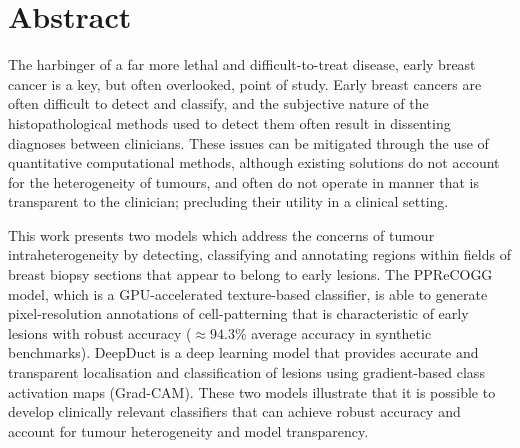 \newpage
\section*{Abstract}

The harbinger of a far more lethal and difficult-to-treat disease, 
early breast cancer is a key, but often overlooked, point of study. 
Early breast cancers are often difficult to detect and classify, and 
the subjective nature of the histopathological methods used to detect 
them often result in dissenting diagnoses between clinicians. These 
issues can be mitigated through the use of quantitative computational 
methods, although existing solutions do not account for the 
heterogeneity of tumours, and often do not operate in manner that is
transparent to the clinician; precluding their utility in a clinical 
setting.

This work presents two models which address the concerns of tumour 
intraheterogeneity by detecting, classifying and annotating regions 
within fields of breast biopsy sections that appear to belong to early 
lesions. The PPReCOGG model, which is a GPU-accelerated texture-based 
classifier, is able to generate pixel-resolution annotations of cell-patterning
that is characteristic of early lesions with robust accuracy 
($\approx94.3\%$ average accuracy in synthetic benchmarks). DeepDuct 
is a deep learning model that provides accurate and transparent 
localisation and classification of lesions using gradient-based class 
activation maps (Grad-CAM). These two models illustrate that it is 
possible to develop clinically relevant classifiers that can achieve 
robust accuracy and account for tumour heterogeneity and model 
transparency.